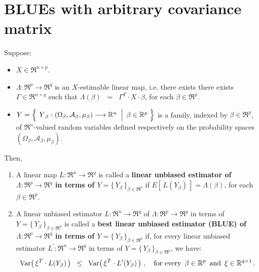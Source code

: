 

\section{BLUEs with arbitrary covariance matrix}
\setcounter{theorem}{0}
\setcounter{equation}{0}

\renewcommand{\theenumi}{\roman{enumi}}
\renewcommand{\labelenumi}{\textnormal{(\theenumi)}$\;\;$}


\begin{definition}
\mbox{}\vskip 0.1cm\noindent
Suppose:
\begin{itemize}
\item
	$X \in \Re^{n \times p}$.
\item
	$\Lambda : \Re^{p} \longrightarrow \Re^{q}$ is an $X$-estimable linear map,
	i.e. there exists there exists $\Gamma \in \Re^{n \times q}$ such that
	$\Lambda(\beta) \;\; =\;\; \Gamma^{T} \cdot X \cdot \beta$,
	for each $\beta \in \Re^{p}$.
\item
	$Y = \left\{\;
		\left.
		\overset{{\color{white}.}}{Y}_{\beta} : (\Omega_{\beta},\mathcal{A}_{\beta},\mu_{\beta}) \longrightarrow \Re^{n}
		\;\;\right\vert\;
		\beta \in \Re^{p}
		\;\right\}$
	is a family, indexed by $\beta \in \Re^{p}$,
	of $\Re^{n}$-valued random variables defined respectively on the
	probability spaces $(\Omega_{\beta},\mathcal{A}_{\beta},\mu_{\beta})$.
\end{itemize}
Then,
\begin{enumerate}
\item
	A linear map $L : \Re^{n} \longrightarrow \Re^{q}$ is called a
	{\color{red}\textbf{linear unbiased estimator of
	$\Lambda : \Re^{p} \longrightarrow \Re^{q}$
	in terms of $Y = \{\,Y_{\beta}\,\}_{\beta\in\Re^{p}}$}} if
	$E\!\left[\,L(Y_{\beta})\,\right] = \Lambda(\beta)$, for each $\beta \in \Re^{p}$.
\item
	A linear unbiased estimator $L : \Re^{n} \longrightarrow \Re^{q}$
	of $\Lambda : \Re^{p} \longrightarrow \Re^{q}$
	in terms of $Y = \{\,Y_{\beta}\,\}_{\beta\in\Re^{p}}$
	is called a
	{\color{red}\textbf{best linear unbiased estimator (BLUE) of
	$\Lambda : \Re^{p} \longrightarrow \Re^{q}$ in terms of $Y = \{\,Y_{\beta}\,\}_{\beta\in\Re^{p}}$}}
	if, for every linear unbiased estimator $L^{\prime} : \Re^{n} \longrightarrow \Re^{q}$
	in terms of $Y = \{\,Y_{\beta}\,\}_{\beta\in\Re^{p}}$, we have:
	\begin{equation*}
	\textnormal{Var}\!\left(\,\xi^{T} \cdot L(Y_{\beta})\,\right)
	\;\; \leq \;\;
		\textnormal{Var}\!\left(\,\xi^{T} \cdot L^{\prime}(Y_{\beta})\,\right)\,,
	\quad
	\textnormal{for every \,$\beta \in \mathbb{R}^{p}$\, and \,$\xi \in \mathbb{R}^{q \times 1}$}\,.
	\end{equation*}
\end{enumerate}
\end{definition}

